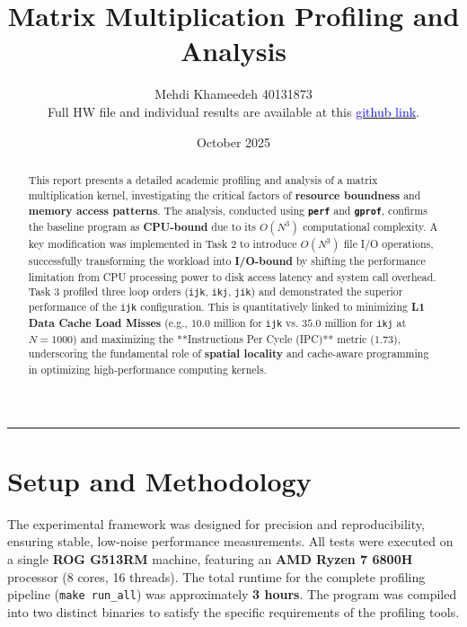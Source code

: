 \documentclass[11pt, a4paper]{article}
\title{Matrix Multiplication Profiling and Analysis}
\author{Mehdi Khameedeh 40131873\\Full HW file and individual results are available at this \href{https://github.com/Khameedeh/GPU-programming-Fall2025/tree/main/homeworks/homework-1/problem-2}{\textcolor{blue}{github link}}.
}
\date{October 2025}
\begin{document}
\maketitle
\thispagestyle{empty}

\vspace{0.5cm} %

\begin{abstract}
This report presents a detailed academic profiling and analysis of a matrix multiplication kernel, investigating the critical factors of \textbf{resource boundness} and \textbf{memory access patterns}. The analysis, conducted using \textbf{\texttt{perf}} and \textbf{\texttt{gprof}}, confirms the baseline program as \textbf{CPU-bound} due to its $O(N^3)$ computational complexity. A key modification was implemented in Task 2 to introduce $O(N^3)$ file I/O operations, successfully transforming the workload into \textbf{I/O-bound} by shifting the performance limitation from CPU processing power to disk access latency and system call overhead. Task 3 profiled three loop orders (\texttt{ijk}, \texttt{ikj}, \texttt{jik}) and demonstrated the superior performance of the \texttt{ijk} configuration. This is quantitatively linked to minimizing \textbf{L1 Data Cache Load Misses} (e.g., $10.0$ million for \texttt{ijk} vs. $35.0$ million for \texttt{ikj} at $N=1000$) and maximizing the **Instructions Per Cycle (IPC)** metric ($1.73$), underscoring the fundamental role of \textbf{spatial locality} and cache-aware programming in optimizing high-performance computing kernels.
\end{abstract}

\hrule %
\vspace{0.3cm} %


\section{Setup and Methodology}
The experimental framework was designed for precision and reproducibility, ensuring stable, low-noise performance measurements. All tests were executed on a single \textbf{ROG G513RM} machine, featuring an \textbf{AMD Ryzen 7 6800H} processor (8 cores, 16 threads). The total runtime for the complete profiling pipeline (\texttt{make run\_all}) was approximately \textbf{3 hours}. The program was compiled into two distinct binaries to satisfy the specific requirements of the profiling tools.
\end{document}
